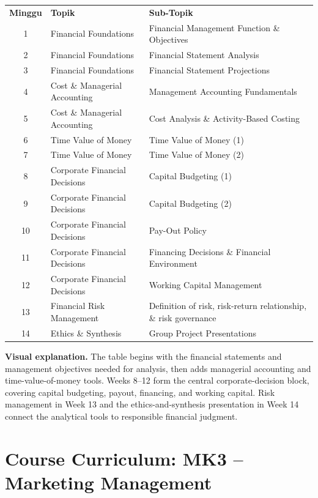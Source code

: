 \documentclass[10pt]{article}
\newcommand{\visualexplanation}[1]{%
  \begin{tcolorbox}[colback=lightgray,colframe=navy!35,boxrule=0.5pt,
    arc=2mm,left=2mm,right=2mm,top=1.5mm,bottom=1.5mm]
  \textbf{Visual explanation.} #1
  \end{tcolorbox}}
\begin{document}
\begin{center}\small
\begin{tabularx}{\textwidth}{c L{5.0cm} Y}
\color{white}\bfseries Minggu & \color{white}\bfseries Topik & \color{white}\bfseries Sub-Topik\\
1 & Financial Foundations & Financial Management Function \& Objectives\\
2 & Financial Foundations & Financial Statement Analysis\\
3 & Financial Foundations & Financial Statement Projections\\
4 & Cost \& Managerial Accounting & Management Accounting Fundamentals\\
5 & Cost \& Managerial Accounting & Cost Analysis \& Activity-Based Costing\\
6 & Time Value of Money & Time Value of Money (1)\\
7 & Time Value of Money & Time Value of Money (2)\\
8 & Corporate Financial Decisions & Capital Budgeting (1)\\
9 & Corporate Financial Decisions & Capital Budgeting (2)\\
10 & Corporate Financial Decisions & Pay-Out Policy\\
11 & Corporate Financial Decisions & Financing Decisions \& Financial Environment\\
12 & Corporate Financial Decisions & Working Capital Management\\
13 & Financial Risk Management & Definition of risk, risk-return relationship, \& risk governance\\
14 & Ethics \& Synthesis & Group Project Presentations\\
\end{tabularx}
\end{center}

\visualexplanation{The table begins with the financial statements and management objectives needed for analysis, then adds managerial accounting and time-value-of-money tools. Weeks 8--12 form the central corporate-decision block, covering capital budgeting, payout, financing, and working capital. Risk management in Week 13 and the ethics-and-synthesis presentation in Week 14 connect the analytical tools to responsible financial judgment.}

\section{Course Curriculum: MK3 -- Marketing Management}
\end{document}
